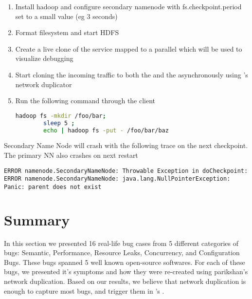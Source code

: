 \begin{adjustwidth}{0.5cm}{}
	\begin{enumerate}
		\item Install hadoop and configure secondary namenode with fs.checkpoint.period set to a small value (eg 3 seconds)
		\item Format filesystem and start HDFS
		\item Create a live clone of the service mapped to a parallel \debugcontainer which will be used to visualize debugging
		\item Start cloning the incoming traffic to both the \productioncontainer and the \debugcontainer asynchronously using \parikshan's network duplicator
		\item Run the following command through the client
		
		\begin{lstlisting}[language=sh]
		hadoop fs -mkdir /foo/bar; 
		sleep 5 ; 
		echo | hadoop fs -put - /foo/bar/baz
		\end{lstlisting}		
	\end{enumerate}

Secondary Name Node will crash with the following trace on the next checkpoint. The primary NN also crashes on next restart

\begin{lstlisting}
ERROR namenode.SecondaryNameNode: Throwable Exception in doCheckpoint:
ERROR namenode.SecondaryNameNode: java.lang.NullPointerException: Panic: parent does not exist
\end{lstlisting}

\end{adjustwidth}

\section{Summary}
\label{sec:parikshanCaseStudySummary}

In this section we presented 16 real-life bug cases from 5 different categories of bugs: Semantic, Performance, Resource Leaks, Concurrency, and Configuration Bugs.
These bugs spanned 5 well known open-source softwares.
For each of these bugs, we presented it's symptoms and how they were re-created using parikshan's network duplication.
Based on our results, we believe that network duplication is enough to capture most bugs, and trigger them in \parikshan's \debugcontainer.